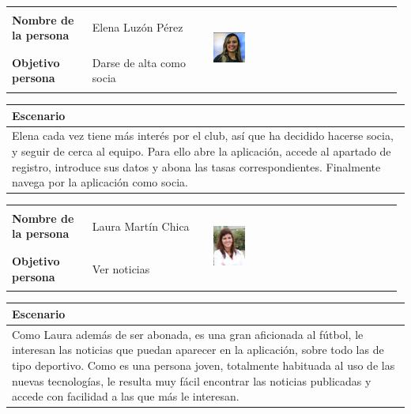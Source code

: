 \documentclass[11pt]{article}
\begin{document}
\begin{table}[H]
  \centering
  \begin{tabular}{p{0.2\linewidth}|p{0.3\linewidth}p{0.475\linewidth}}
    \toprule
    \textbf{Nombre de la persona} & Elena Luzón Pérez &\multirow{2}{*}{\begin{minipage}{1.\textwidth}\includegraphics[width=0.18\textwidth, height=26mm]{Elena}\end{minipage}}\\
    \textbf{Objetivo persona} & Darse de alta como socia & \\
    \bottomrule
  \end{tabular}

\begin{tabular}{p{1.028\linewidth}}
  \textbf{Escenario}\\
  \midrule
  Elena cada vez tiene más interés por el club, así que ha decidido hacerse socia, y seguir de cerca al equipo. Para ello abre la aplicación, accede al apartado de registro, introduce sus datos y abona las tasas correspondientes. Finalmente navega por la aplicación como socia. 
\end{tabular}
\end{table}

\begin{table}[H]
  \centering
  \begin{tabular}{p{0.2\linewidth}|p{0.3\linewidth}p{0.475\linewidth}}
    \toprule
    \textbf{Nombre de la persona} & Laura Martín Chica &\multirow{2}{*}{\begin{minipage}{1.\textwidth}\includegraphics[width=0.18\textwidth, height=26mm]{Ana}\end{minipage}}\\
    \textbf{Objetivo persona} & Ver noticias & \\
    \bottomrule
  \end{tabular}

\begin{tabular}{p{1.028\linewidth}}
  \textbf{Escenario}\\
  \midrule
  Como Laura además de ser abonada, es una gran aficionada al fútbol, le interesan las noticias que puedan aparecer en la aplicación, sobre todo las de tipo deportivo. Como es una persona joven, totalmente habituada al uso de las nuevas tecnologías, le resulta muy fácil encontrar las noticias publicadas y accede con facilidad a las que más le interesan.
\end{tabular}
\end{table}
\end{document}
